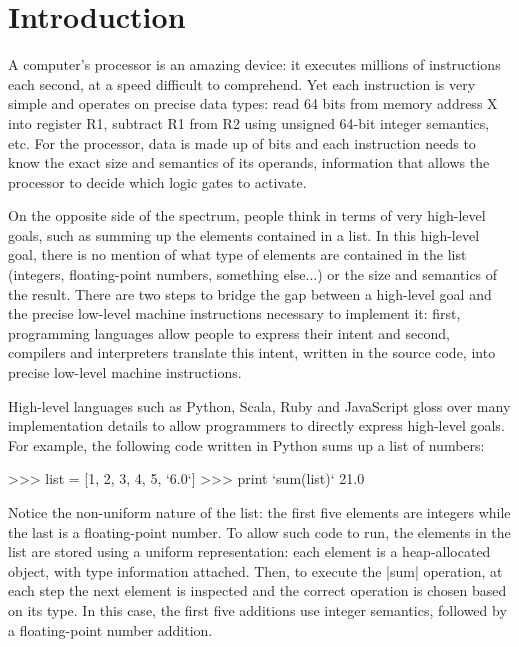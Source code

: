 \chapter{Introduction}
\label{chapter:intro}

A computer's processor is an amazing device: it executes millions of instructions each second, at a speed difficult to comprehend. Yet each instruction is very simple and operates on precise data types: read 64 bits from memory address X into register R1, subtract R1 from R2 using unsigned 64-bit integer semantics, etc. For the processor, data is made up of bits and each instruction needs to know the exact size and semantics of its operands, information that allows the processor to decide which logic gates to activate.

On the opposite side of the spectrum, people think in terms of very high-level goals, such as summing up the elements contained in a list. In this high-level goal, there is no mention of what type of elements are contained in the list (integers, floating-point numbers, something else...) or the size and semantics of the result. There are two steps to bridge the gap between a high-level goal and the precise low-level machine instructions necessary to implement it: first, programming languages allow people to express their intent and second, compilers and interpreters translate this intent, written in the source code, into precise low-level machine instructions.

High-level languages such as Python, Scala, Ruby and JavaScript gloss over many implementation details to allow programmers to directly express high-level goals. For example, the following code written in Python sums up a list of numbers:

\begin{lstlisting-nobreak}
 >>> list = [1, 2, 3, 4, 5, `6.0`]
 >>> print `sum(list)`
 21.0
\end{lstlisting-nobreak}

Notice the non-uniform nature of the list: the first five elements are integers while the last is a floating-point number. To allow such code to run, the elements in the list are stored using a uniform representation: each element is a heap-allocated object, with type information attached. Then, to execute the |sum| operation, at each step the next element is inspected and the correct operation is chosen based on its type. In this case, the first five additions use integer semantics, followed by a floating-point number addition. %

